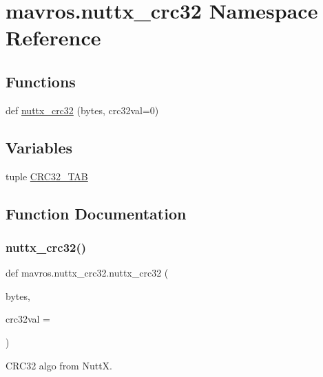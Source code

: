 \hypertarget{namespacemavros_1_1nuttx__crc32}{}\section{mavros.\+nuttx\+\_\+crc32 Namespace Reference}
\label{namespacemavros_1_1nuttx__crc32}
\subsection*{Functions}
\begin{DoxyCompactItemize}
\item 
def \mbox{\hyperlink{namespacemavros_1_1nuttx__crc32_a48d7b33117c7c69de2e6e939f1091a35}{nuttx\+\_\+crc32}} (bytes, crc32val=0)
\end{DoxyCompactItemize}
\subsection*{Variables}
\begin{DoxyCompactItemize}
\item 
tuple \mbox{\hyperlink{namespacemavros_1_1nuttx__crc32_a3a0d08f2f707f86fdd0fc6e0a880e717}{C\+R\+C32\+\_\+\+T\+AB}}
\end{DoxyCompactItemize}


\subsection{Function Documentation}
\mbox{\label{namespacemavros_1_1nuttx__crc32_a48d7b33117c7c69de2e6e939f1091a35}} 
\subsubsection{\texorpdfstring{nuttx\_crc32()}{nuttx\_crc32()}}
{\footnotesize\ttfamily def mavros.\+nuttx\+\_\+crc32.\+nuttx\+\_\+crc32 (\begin{DoxyParamCaption}\item[{}]{bytes,  }\item[{}]{crc32val = {} }\end{DoxyParamCaption})}

\begin{DoxyVerb}CRC32 algo from NuttX.
\end{DoxyVerb}
 

